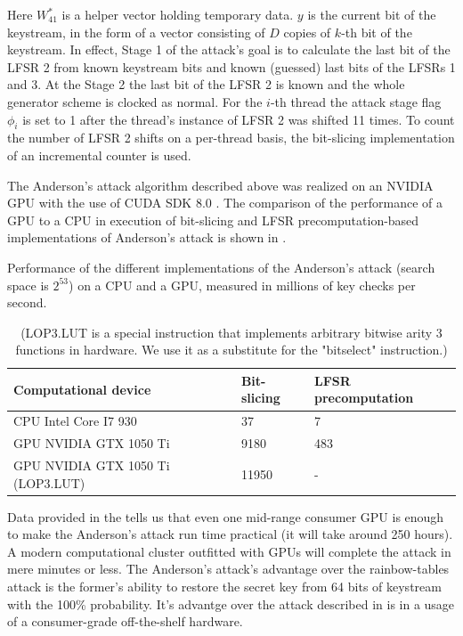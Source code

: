 \documentclass[runningheads,a4paper]{llncs}[2015/06/24]
\begin{document}
Here $W^\ast_{41}$ is a helper vector holding temporary data. $y$ is the
current bit of the keystream, in the form of a vector consisting of $D$ copies
of $k$-th bit of the keystream. In effect, Stage 1 of the attack's goal is to
calculate the last bit of the LFSR 2 from known keystream bits and known
(guessed) last bits of the LFSRs 1 and 3. At the Stage 2 the last bit of the
LFSR 2 is known and the whole generator scheme is clocked as normal. For the
$i$-th thread the attack stage flag $\phi_i$ is set to 1 after the thread's
instance of LFSR 2 was shifted 11 times. To count the number of LFSR 2 shifts
on a per-thread basis, the bit-slicing implementation of an incremental counter
is used.

The Anderson's attack algorithm described above was realized on an NVIDIA GPU
with the use of CUDA SDK 8.0 \cite{CUDA}. The comparison of the performance of
a GPU to a CPU in execution of bit-slicing and LFSR precomputation-based
\cite{BSW} implementations of Anderson's attack is shown in
\cite{tab:gpuspeed}.


\begin{table} \caption{(LOP3.LUT is a special instruction that implements
	arbitrary bitwise arity 3 functions in hardware. We use it as a substitute
	for the "bitselect" instruction.)} 
	\label{tab:gpuspeed} Performance of the different implementations of the
	Anderson's attack (search space is $2^{53}$) on a CPU and a GPU, measured
	in millions of key checks per second.  
	\begin {center} 
	\begin{tabular} {| l | l | l |} \hline Computational device & Bit-slicing &
		LFSR precomputation \cite{BSW} \\ \hline CPU Intel Core I7 930 & 37 & 7
		\\ \hline GPU NVIDIA GTX 1050 Ti & 9180 & 483 \\ \hline GPU NVIDIA GTX
		1050 Ti (LOP3.LUT) & 11950 & - \\ \hline
	\end{tabular}
\end {center}
\end{table}

Data provided in the  tells us that even one mid-range
consumer GPU is enough to make the Anderson's attack run time practical (it
will take around 250 hours). A modern computational cluster outfitted with GPUs
will complete the attack in mere minutes or less. The Anderson's attack's
advantage over the rainbow-tables attack \cite{RAINBOW} is the former's ability
to restore the secret key from 64 bits of keystream with the 100\% probability.
It's advantge over the attack described in \cite{COPAC_1} is in a usage of a
consumer-grade off-the-shelf hardware.
\end{document}
